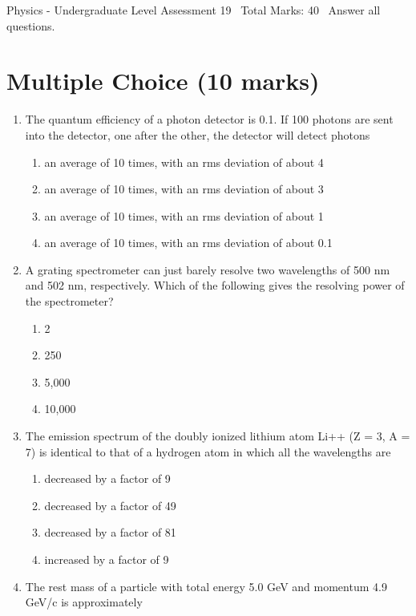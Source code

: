 \documentclass[12pt]{article}
\begin{document}
\begin{center}
Physics - Undergraduate Level Assessment 19 \
Total Marks: 40 \
Answer all questions.
\end{center}

\section*{Multiple Choice (10 marks)}
\begin{enumerate}[label=\arabic*.]
\item The quantum efficiency of a photon detector is 0.1. If 100 photons are sent into the detector, one after the other, the detector will detect photons
\begin{enumerate}[label=(\alph*)]
    \item an average of 10 times, with an rms deviation of about 4
    \item an average of 10 times, with an rms deviation of about 3
    \item an average of 10 times, with an rms deviation of about 1
    \item an average of 10 times, with an rms deviation of about 0.1
\end{enumerate}
\item A grating spectrometer can just barely resolve two wavelengths of 500 nm and 502 nm, respectively. Which of the following gives the resolving power of the spectrometer?
\begin{enumerate}[label=(\alph*)]
    \item 2
    \item 250
    \item 5,000
    \item 10,000
\end{enumerate}
\item The emission spectrum of the doubly ionized lithium atom Li++ (Z = 3, A = 7) is identical to that of a hydrogen atom in which all the wavelengths are
\begin{enumerate}[label=(\alph*)]
    \item decreased by a factor of 9
    \item decreased by a factor of 49
    \item decreased by a factor of 81
    \item increased by a factor of 9
\end{enumerate}
\item The rest mass of a particle with total energy 5.0 GeV and momentum 4.9 GeV/c is approximately

\end{enumerate}
\end{document}

